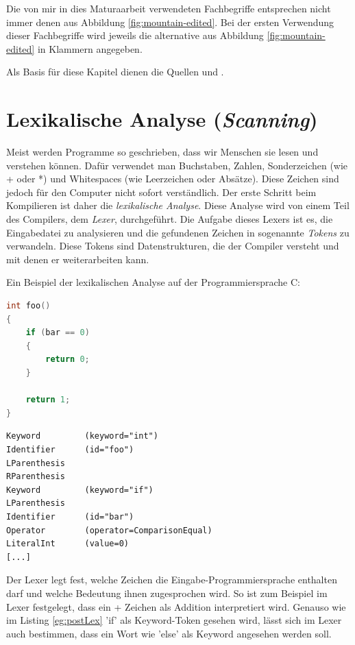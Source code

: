 Die von mir in dies Maturaarbeit verwendeten Fachbegriffe entsprechen nicht immer denen aus Abbildung \ref{fig:mountain-edited}.
Bei der ersten Verwendung dieser Fachbegriffe wird jeweils die alternative aus Abbildung \ref{fig:mountain-edited} in Klammern angegeben.

Als Basis für diese Kapitel dienen die Quellen \cite{CompilersDragon} und \cite{Lecture}.

\section{Lexikalische Analyse (\textit{Scanning})}
Meist werden Programme so geschrieben, dass wir Menschen sie lesen und verstehen können. Dafür verwendet man Buchstaben, Zahlen, Sonderzeichen (wie + oder *) und Whitespaces (wie Leerzeichen oder Absätze).
Diese Zeichen sind jedoch für den Computer nicht sofort verständlich. Der erste Schritt beim Kompilieren ist daher die \textit{lexikalische Analyse}. Diese Analyse wird von einem Teil des Compilers, dem \textit{Lexer}, durchgeführt.
Die Aufgabe dieses Lexers ist es, die Eingabedatei zu analysieren und die gefundenen Zeichen in sogenannte \textit{Tokens} zu verwandeln. Diese Tokens sind Datenstrukturen, die der Compiler versteht und mit denen er weiterarbeiten kann.

Ein Beispiel der lexikalischen Analyse auf der Programmiersprache C:

\begin{lstlisting}[language=C, label=eg:preLex, caption=C code vor lexikalischer Analyse]
int foo()
{
    if (bar == 0)
    {
        return 0;
    }

    return 1;
}
\end{lstlisting}

\begin{lstlisting}[label=eg:postLex, caption=Tokens nach lexikalischer Analyse]
Keyword         (keyword="int")
Identifier      (id="foo")
LParenthesis
RParenthesis
Keyword         (keyword="if")
LParenthesis
Identifier      (id="bar")
Operator        (operator=ComparisonEqual)
LiteralInt      (value=0)
[...]
\end{lstlisting}

Der Lexer legt fest, welche Zeichen die Eingabe-Programmiersprache enthalten darf und welche Bedeutung ihnen zugesprochen wird. So ist zum Beispiel im Lexer festgelegt, dass ein + Zeichen als Addition interpretiert wird.
Genauso wie im Listing \ref{eg:postLex} {\listingFont\selectfont 'if'} als Keyword-Token gesehen wird, lässt sich im Lexer auch bestimmen, dass ein Wort wie {\listingFont\selectfont 'else'} als Keyword angesehen werden soll.

